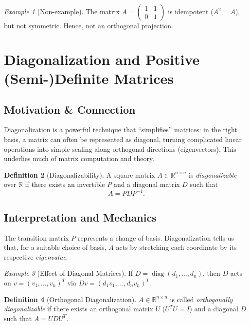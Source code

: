 \documentclass[12pt]{article}
\theoremstyle{definition}
\newtheorem{definition}{Definition}[section]
\theoremstyle{plain}
\theoremstyle{remark}
\newtheorem{example}[definition]{Example}
\begin{document}
\begin{example}[Non-example]
    The matrix $A = \begin{pmatrix}1 & 1\\ 0 & 1\end{pmatrix}$ is idempotent ($A^2 = A$), but not symmetric. Hence, not an orthogonal projection.
\end{example}

\section{Diagonalization and Positive (Semi-)Definite Matrices}

\subsection{Motivation \& Connection}

Diagonalization is a powerful technique that ``simplifies'' matrices: in the right basis, a matrix can often be represented as diagonal, turning complicated linear operations into simple scaling along orthogonal directions (eigenvectors). This underlies much of matrix computation and theory.

\begin{definition}[Diagonalizability]
    A square matrix $A \in \mathbb{R}^{n \times n}$ is \emph{diagonalizable} over $\mathbb{R}$ if there exists an invertible $P$ and a diagonal matrix $D$ such that
    \[
        A = P D P^{-1}.
    \]
\end{definition}

\subsection{Interpretation and Mechanics}

The transition matrix $P$ represents a change of basis. Diagonalization tells us that, for a suitable choice of basis, $A$ acts by stretching each coordinate by its respective \emph{eigenvalue}.

\begin{example}[Effect of Diagonal Matrices]
    \label{ex:diagonal-action}
    If $D = \operatorname{diag}(d_1, \dots, d_n)$, then $D$ acts on $v = (v_1,\dots, v_n)^T$ via $D v = (d_1 v_1, \dots, d_n v_n)^T$.
\end{example}

\begin{definition}[Orthogonal Diagonalization]
    $A \in \mathbb{R}^{n \times n}$ is called \emph{orthogonally diagonalizable} if there exists an orthogonal matrix $U$ ($U^T U = I$) and a diagonal $D$ such that $A = U D U^T$.
\end{definition}
\end{document}
